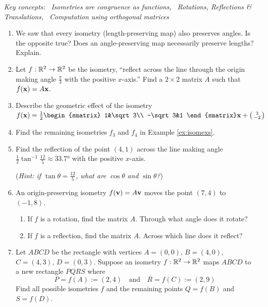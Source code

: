 \begin{exercises}
	\hangindent\leftmargini\emph{Key concepts: \ Isometries are congruence as functions, \ Rotations, Reflections \& Translations, \ Computation using orthogonal matrices}
	
	\begin{enumerate}
		\item We saw that every isometry (length-preserving map) also preserves angles. Is the opposite true? Does an angle-preserving map necessarily preserve lengths? Explain.
		
		\item Let $f:\mathbb{R}^2\to\mathbb{R}^2$ be the isometry, ``reflect across the line through the origin making angle $\frac\pi 3$ with the positive $x$-axis.'' Find a $2\times 2$ matrix $A$ such that $f({\mathbf{x}})=A{\mathbf{x}}$.
		
	  \item Describe the geometric effect of the isometry $f(\vx)=\frac 12
	  \begin{smatrix}
	  	1&\sqrt 3\\
	  	-\sqrt 3&1
	  \end{smatrix}
	  \vx+\stwovec 3{-2}$
	  
		\item Find the remaining isometries $f_3$ and $f_4$ in Example \ref{ex:isomexs}.
		
		\item Find the reflection of the point $(4,1)$ across the line making angle $\frac 12\tan^{-1}\frac{12}5\approx \ang{33.7}$ with the positive $x$-axis.\par
		(\emph{Hint: if $\tan\theta=\frac{12}5$, what are $\cos\theta$ and $\sin\theta$?})
		
	  \item An origin-preserving isometry $f({\mathbf{v}})=A{\mathbf{v}}$ moves the point $(7,4)$ to $(-1,8)$.
	  \begin{enumerate}
	    \item If $f$ is a rotation, find the matrix $A$. Through what angle does it rotate?
	    \item If $f$ is a reflection, find the matrix $A$. Across which line does it reflect?
	  \end{enumerate}
	  
	  \item Let $ABCD$ be the rectangle with vertices $A=(0,0)$, $B=(4,0)$, $C=(4,3)$, $D=(0,3)$.
		Suppose an isometry $f:\mathbb{R}^2\to\mathbb{R}^2$ maps $ABCD$ to a new rectangle $PQRS$ where
		\[
			P=f(A):=(2,4)\quad \text{and}\quad R=f(C):=(2,9)
		\]
		Find all possible isometries $f$ and the remaining points $Q=f(B)$ and $S=f(D)$.
		

\end{enumerate}
\end{exercises}
